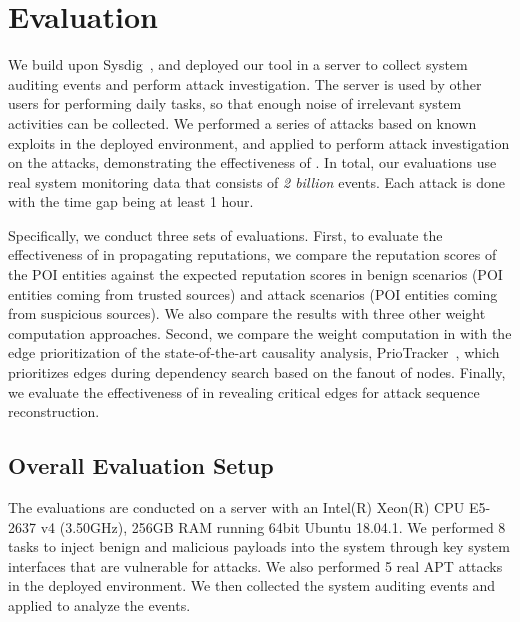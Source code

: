 \section{Evaluation}

We build \tool upon Sysdig~\cite{sysdig}, and deployed our tool in a server to collect system auditing events and perform attack investigation. 
The server is used by other users for performing daily tasks, so that enough noise of irrelevant system activities can be collected.
We performed a series of attacks based on known exploits in the deployed environment,
and applied \tool to perform attack investigation on the attacks, demonstrating the effectiveness of \tool.
In total, our evaluations use 
real
system monitoring data that consists of \emph{2 billion} events. 
Each attack is done with the time gap being at least 1 hour.

Specifically, we conduct three sets of evaluations.
First, to evaluate the effectiveness of \tool in propagating reputations,
we compare the reputation scores of the POI entities against the expected reputation scores in benign scenarios (POI entities coming from trusted sources) and attack scenarios (POI entities coming from suspicious sources).
We also compare the results with three other weight computation approaches.
Second, we compare the weight computation in \tool with the edge prioritization of the state-of-the-art causality analysis, PrioTracker~\cite{liu2018priotracker}, which prioritizes edges during dependency search based on the fanout of nodes.
Finally, we evaluate the effectiveness of \tool in revealing critical edges for attack sequence reconstruction.






\subsection{Overall Evaluation Setup}
\label{subsec:cases}
The evaluations are conducted on a server with an Intel(R) Xeon(R) CPU E5-2637 v4 (3.50GHz), 256GB RAM running 64bit Ubuntu 18.04.1.
We performed 8 tasks to inject benign and malicious payloads into the system through key system interfaces that are vulnerable for attacks.
We also performed 5 real APT attacks in the deployed environment. 
We then collected the system auditing events and applied \tool to analyze the events.


